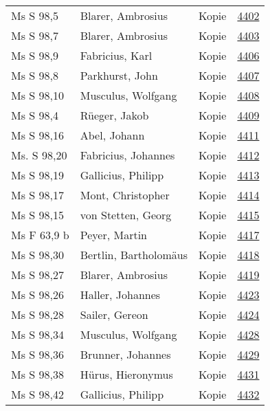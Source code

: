 \documentclass[10pt,a4paper,landscape]{report}
\begin{document}
\begin{longtable}{p{16cm}p{4cm}lr}
Ms S 98,5	&	Blarer, Ambrosius	&	Kopie	&	\href{http://130.60.24.72/assignment/4402}{4402}\\
Ms S 98,7	&	Blarer, Ambrosius	&	Kopie	&	\href{http://130.60.24.72/assignment/4403}{4403}\\
Ms S 98,9	&	Fabricius, Karl	&	Kopie	&	\href{http://130.60.24.72/assignment/4406}{4406}\\
Ms S 98,8	&	Parkhurst, John	&	Kopie	&	\href{http://130.60.24.72/assignment/4407}{4407}\\
Ms S 98,10	&	Musculus, Wolfgang	&	Kopie	&	\href{http://130.60.24.72/assignment/4408}{4408}\\
Ms S 98,4	&	Rüeger, Jakob	&	Kopie	&	\href{http://130.60.24.72/assignment/4409}{4409}\\
Ms S 98,16	&	Abel, Johann	&	Kopie	&	\href{http://130.60.24.72/assignment/4411}{4411}\\
Ms. S 98,20	&	Fabricius, Johannes	&	Kopie	&	\href{http://130.60.24.72/assignment/4412}{4412}\\
Ms S 98,19	&	Gallicius, Philipp	&	Kopie	&	\href{http://130.60.24.72/assignment/4413}{4413}\\
Ms S 98,17	&	Mont, Christopher	&	Kopie	&	\href{http://130.60.24.72/assignment/4414}{4414}\\
Ms S 98,15	&	von Stetten, Georg	&	Kopie	&	\href{http://130.60.24.72/assignment/4415}{4415}\\
Ms F 63,9 b	&	Peyer, Martin	&	Kopie	&	\href{http://130.60.24.72/assignment/4417}{4417}\\
Ms S 98,30	&	Bertlin, Bartholomäus	&	Kopie	&	\href{http://130.60.24.72/assignment/4418}{4418}\\
Ms S 98,27	&	Blarer, Ambrosius	&	Kopie	&	\href{http://130.60.24.72/assignment/4419}{4419}\\
Ms S 98,26	&	Haller, Johannes	&	Kopie	&	\href{http://130.60.24.72/assignment/4423}{4423}\\
Ms S 98,28	&	Sailer, Gereon	&	Kopie	&	\href{http://130.60.24.72/assignment/4424}{4424}\\
Ms S 98,34	&	Musculus, Wolfgang	&	Kopie	&	\href{http://130.60.24.72/assignment/4428}{4428}\\
Ms S 98,36	&	Brunner, Johannes	&	Kopie	&	\href{http://130.60.24.72/assignment/4429}{4429}\\
Ms S 98,38	&	Hürus, Hieronymus	&	Kopie	&	\href{http://130.60.24.72/assignment/4431}{4431}\\
Ms S 98,42	&	Gallicius, Philipp	&	Kopie	&	\href{http://130.60.24.72/assignment/4432}{4432}\\

\end{longtable}
\end{document}
